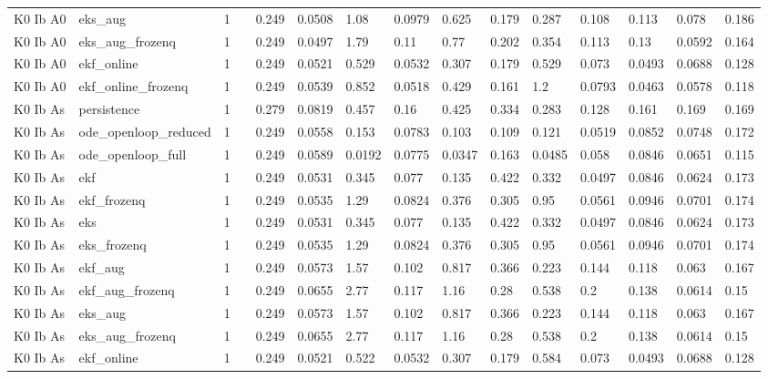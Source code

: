 \begin{table}[t]
\begin{tabular}{lllllllllllllll}
K0 Ib A0 & eks\_aug & 1 &  & 0.249 & 0.0508 & 1.08 & 0.0979 & 0.625 & 0.179 & 0.287 & 0.108 & 0.113 & 0.078 & 0.186 \\
K0 Ib A0 & eks\_aug\_frozenq & 1 &  & 0.249 & 0.0497 & 1.79 & 0.11 & 0.77 & 0.202 & 0.354 & 0.113 & 0.13 & 0.0592 & 0.164 \\
K0 Ib A0 & ekf\_online & 1 &  & 0.249 & 0.0521 & 0.529 & 0.0532 & 0.307 & 0.179 & 0.529 & 0.073 & 0.0493 & 0.0688 & 0.128 \\
K0 Ib A0 & ekf\_online\_frozenq & 1 &  & 0.249 & 0.0539 & 0.852 & 0.0518 & 0.429 & 0.161 & 1.2 & 0.0793 & 0.0463 & 0.0578 & 0.118 \\
K0 Ib As & persistence & 1 &  & 0.279 & 0.0819 & 0.457 & 0.16 & 0.425 & 0.334 & 0.283 & 0.128 & 0.161 & 0.169 & 0.169 \\
K0 Ib As & ode\_openloop\_reduced & 1 &  & 0.249 & 0.0558 & 0.153 & 0.0783 & 0.103 & 0.109 & 0.121 & 0.0519 & 0.0852 & 0.0748 & 0.172 \\
K0 Ib As & ode\_openloop\_full & 1 &  & 0.249 & 0.0589 & 0.0192 & 0.0775 & 0.0347 & 0.163 & 0.0485 & 0.058 & 0.0846 & 0.0651 & 0.115 \\
K0 Ib As & ekf & 1 &  & 0.249 & 0.0531 & 0.345 & 0.077 & 0.135 & 0.422 & 0.332 & 0.0497 & 0.0846 & 0.0624 & 0.173 \\
K0 Ib As & ekf\_frozenq & 1 &  & 0.249 & 0.0535 & 1.29 & 0.0824 & 0.376 & 0.305 & 0.95 & 0.0561 & 0.0946 & 0.0701 & 0.174 \\
K0 Ib As & eks & 1 &  & 0.249 & 0.0531 & 0.345 & 0.077 & 0.135 & 0.422 & 0.332 & 0.0497 & 0.0846 & 0.0624 & 0.173 \\
K0 Ib As & eks\_frozenq & 1 &  & 0.249 & 0.0535 & 1.29 & 0.0824 & 0.376 & 0.305 & 0.95 & 0.0561 & 0.0946 & 0.0701 & 0.174 \\
K0 Ib As & ekf\_aug & 1 &  & 0.249 & 0.0573 & 1.57 & 0.102 & 0.817 & 0.366 & 0.223 & 0.144 & 0.118 & 0.063 & 0.167 \\
K0 Ib As & ekf\_aug\_frozenq & 1 &  & 0.249 & 0.0655 & 2.77 & 0.117 & 1.16 & 0.28 & 0.538 & 0.2 & 0.138 & 0.0614 & 0.15 \\
K0 Ib As & eks\_aug & 1 &  & 0.249 & 0.0573 & 1.57 & 0.102 & 0.817 & 0.366 & 0.223 & 0.144 & 0.118 & 0.063 & 0.167 \\
K0 Ib As & eks\_aug\_frozenq & 1 &  & 0.249 & 0.0655 & 2.77 & 0.117 & 1.16 & 0.28 & 0.538 & 0.2 & 0.138 & 0.0614 & 0.15 \\
K0 Ib As & ekf\_online & 1 &  & 0.249 & 0.0521 & 0.522 & 0.0532 & 0.307 & 0.179 & 0.584 & 0.073 & 0.0493 & 0.0688 & 0.128 \\

\end{tabular}
\end{table}
